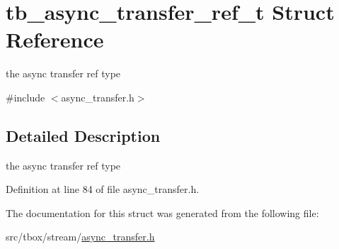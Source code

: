 \hypertarget{structtb__async__transfer__ref__t}{\section{tb\-\_\-async\-\_\-transfer\-\_\-ref\-\_\-t Struct Reference}
\label{structtb__async__transfer__ref__t}
}


the async transfer ref type  




{\ttfamily \#include $<$async\-\_\-transfer.\-h$>$}



\subsection{Detailed Description}
the async transfer ref type 

Definition at line 84 of file async\-\_\-transfer.\-h.



The documentation for this struct was generated from the following file\-:\begin{DoxyCompactItemize}
\item 
src/tbox/stream/\hyperlink{async__transfer_8h}{async\-\_\-transfer.\-h}\end{DoxyCompactItemize}
